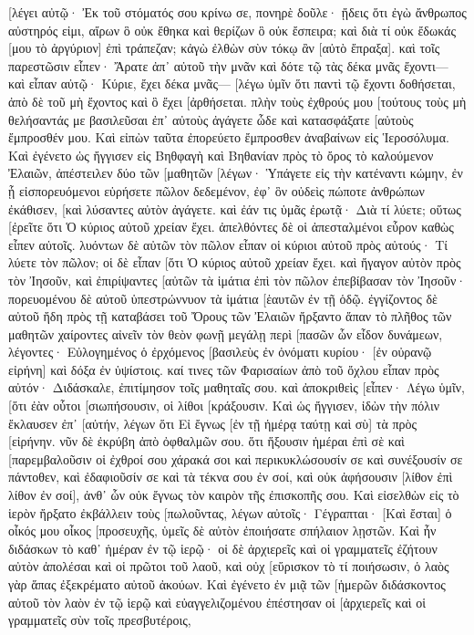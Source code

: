 [λέγει αὐτῷ· Ἐκ τοῦ στόματός σου κρίνω σε, πονηρὲ δοῦλε· ᾔδεις ὅτι ἐγὼ ἄνθρωπος αὐστηρός εἰμι, αἴρων ὃ οὐκ ἔθηκα καὶ θερίζων ὃ οὐκ ἔσπειρα; 
καὶ διὰ τί οὐκ ἔδωκάς [μου τὸ ἀργύριον] ἐπὶ τράπεζαν; κἀγὼ ἐλθὼν σὺν τόκῳ ἂν [αὐτὸ ἔπραξα]. 
καὶ τοῖς παρεστῶσιν εἶπεν· Ἄρατε ἀπ᾽ αὐτοῦ τὴν μνᾶν καὶ δότε τῷ τὰς δέκα μνᾶς ἔχοντι— 
καὶ εἶπαν αὐτῷ· Κύριε, ἔχει δέκα μνᾶς— 
[λέγω ὑμῖν ὅτι παντὶ τῷ ἔχοντι δοθήσεται, ἀπὸ δὲ τοῦ μὴ ἔχοντος καὶ ὃ ἔχει [ἀρθήσεται. 
πλὴν τοὺς ἐχθρούς μου [τούτους τοὺς μὴ θελήσαντάς με βασιλεῦσαι ἐπ᾽ αὐτοὺς ἀγάγετε ὧδε καὶ κατασφάξατε [αὐτοὺς ἔμπροσθέν μου. 
Καὶ εἰπὼν ταῦτα ἐπορεύετο ἔμπροσθεν ἀναβαίνων εἰς Ἱεροσόλυμα. 
Καὶ ἐγένετο ὡς ἤγγισεν εἰς Βηθφαγὴ καὶ Βηθανίαν πρὸς τὸ ὄρος τὸ καλούμενον Ἐλαιῶν, ἀπέστειλεν δύο τῶν [μαθητῶν 
[λέγων· Ὑπάγετε εἰς τὴν κατέναντι κώμην, ἐν ᾗ εἰσπορευόμενοι εὑρήσετε πῶλον δεδεμένον, ἐφ᾽ ὃν οὐδεὶς πώποτε ἀνθρώπων ἐκάθισεν, [καὶ λύσαντες αὐτὸν ἀγάγετε. 
καὶ ἐάν τις ὑμᾶς ἐρωτᾷ· Διὰ τί λύετε; οὕτως [ἐρεῖτε ὅτι Ὁ κύριος αὐτοῦ χρείαν ἔχει. 
ἀπελθόντες δὲ οἱ ἀπεσταλμένοι εὗρον καθὼς εἶπεν αὐτοῖς. 
λυόντων δὲ αὐτῶν τὸν πῶλον εἶπαν οἱ κύριοι αὐτοῦ πρὸς αὐτούς· Τί λύετε τὸν πῶλον; 
οἱ δὲ εἶπαν [ὅτι Ὁ κύριος αὐτοῦ χρείαν ἔχει. 
καὶ ἤγαγον αὐτὸν πρὸς τὸν Ἰησοῦν, καὶ ἐπιρίψαντες [αὐτῶν τὰ ἱμάτια ἐπὶ τὸν πῶλον ἐπεβίβασαν τὸν Ἰησοῦν· 
πορευομένου δὲ αὐτοῦ ὑπεστρώννυον τὰ ἱμάτια [ἑαυτῶν ἐν τῇ ὁδῷ. 
ἐγγίζοντος δὲ αὐτοῦ ἤδη πρὸς τῇ καταβάσει τοῦ Ὄρους τῶν Ἐλαιῶν ἤρξαντο ἅπαν τὸ πλῆθος τῶν μαθητῶν χαίροντες αἰνεῖν τὸν θεὸν φωνῇ μεγάλῃ περὶ [πασῶν ὧν εἶδον δυνάμεων, 
λέγοντες· Εὐλογημένος ὁ ἐρχόμενος [βασιλεὺς ἐν ὀνόματι κυρίου· [ἐν οὐρανῷ εἰρήνη] καὶ δόξα ἐν ὑψίστοις. 
καί τινες τῶν Φαρισαίων ἀπὸ τοῦ ὄχλου εἶπαν πρὸς αὐτόν· Διδάσκαλε, ἐπιτίμησον τοῖς μαθηταῖς σου. 
καὶ ἀποκριθεὶς [εἶπεν· Λέγω ὑμῖν, [ὅτι ἐὰν οὗτοι [σιωπήσουσιν, οἱ λίθοι [κράξουσιν. 
Καὶ ὡς ἤγγισεν, ἰδὼν τὴν πόλιν ἔκλαυσεν ἐπ᾽ [αὐτήν, 
λέγων ὅτι Εἰ ἔγνως [ἐν τῇ ἡμέρᾳ ταύτῃ καὶ σὺ] τὰ πρὸς [εἰρήνην. νῦν δὲ ἐκρύβη ἀπὸ ὀφθαλμῶν σου. 
ὅτι ἥξουσιν ἡμέραι ἐπὶ σὲ καὶ [παρεμβαλοῦσιν οἱ ἐχθροί σου χάρακά σοι καὶ περικυκλώσουσίν σε καὶ συνέξουσίν σε πάντοθεν, 
καὶ ἐδαφιοῦσίν σε καὶ τὰ τέκνα σου ἐν σοί, καὶ οὐκ ἀφήσουσιν [λίθον ἐπὶ λίθον ἐν σοί], ἀνθ᾽ ὧν οὐκ ἔγνως τὸν καιρὸν τῆς ἐπισκοπῆς σου. 
Καὶ εἰσελθὼν εἰς τὸ ἱερὸν ἤρξατο ἐκβάλλειν τοὺς [πωλοῦντας, 
λέγων αὐτοῖς· Γέγραπται· [Καὶ ἔσται] ὁ οἶκός μου οἶκος [προσευχῆς, ὑμεῖς δὲ αὐτὸν ἐποιήσατε σπήλαιον λῃστῶν. 
Καὶ ἦν διδάσκων τὸ καθ᾽ ἡμέραν ἐν τῷ ἱερῷ· οἱ δὲ ἀρχιερεῖς καὶ οἱ γραμματεῖς ἐζήτουν αὐτὸν ἀπολέσαι καὶ οἱ πρῶτοι τοῦ λαοῦ, 
καὶ οὐχ [εὕρισκον τὸ τί ποιήσωσιν, ὁ λαὸς γὰρ ἅπας ἐξεκρέματο αὐτοῦ ἀκούων. 
Καὶ ἐγένετο ἐν μιᾷ τῶν [ἡμερῶν διδάσκοντος αὐτοῦ τὸν λαὸν ἐν τῷ ἱερῷ καὶ εὐαγγελιζομένου ἐπέστησαν οἱ [ἀρχιερεῖς καὶ οἱ γραμματεῖς σὺν τοῖς πρεσβυτέροις, 
